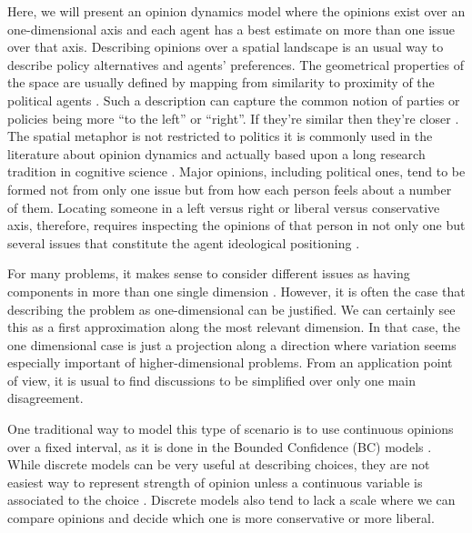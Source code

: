 \documentclass{article}
\begin{document}
Here, we will present an opinion dynamics model \cite{castellanoetal07,
  galam12a, galametal82, galammoscovici91, sznajd00, deffuantetal00, martins08a}
where the opinions exist over an one-dimensional axis and each agent has a best
estimate on more than one issue over that axis. Describing opinions over a
spatial landscape is an usual way to describe policy alternatives and agents'
preferences. The geometrical properties of the space are usually defined by
mapping from similarity to proximity of the political agents
\cite{downs1957economic, laver2014measuring, tomz2008candidate}. Such a
description can capture the common notion of parties or policies being more ``to
the left'' or ``right''. If they're similar then they're closer
\cite{van2005political, miller2015spatial}. The spatial metaphor is not
restricted to politics it is commonly used in the literature about opinion
dynamics and actually based upon a long research tradition in cognitive science
\cite{aisbett2001general, attneave1950dimensions,gardenfors2004conceptual}.
Major opinions, including political ones, tend to be formed not from only one
issue but from how each person feels about a number of them. Locating someone in
a left versus right or liberal versus conservative axis, therefore, requires
inspecting the opinions of that person in not only one but several issues that
constitute the agent ideological positioning \cite{benoit2006party}.

For many problems, it makes sense to consider different issues as having
components in more than one single dimension \cite{vicenteetal08b}. However, it
is often the case that describing the problem as one-dimensional can be
justified. We can certainly see this as a first approximation along the most
relevant dimension. In that case, the one dimensional case is just a projection
along a direction where variation seems especially important of
higher-dimensional problems. From an application point of view, it is usual to
find discussions to be simplified over only one main disagreement.

One traditional way to model this type of scenario is to use continuous opinions
over a fixed interval, as it is done in the Bounded Confidence (BC) models
\cite{deffuantetal00,hegselmannkrause02}. While discrete models
\cite{galametal82,galammoscovici91,sznajd00} can be very useful at describing
choices, they are not easiest way to represent strength of opinion unless a
continuous variable is associated to the choice \cite{martins08a}. Discrete
models also tend to lack a scale where we can compare opinions and decide which
one is more conservative or more liberal.
\end{document}
